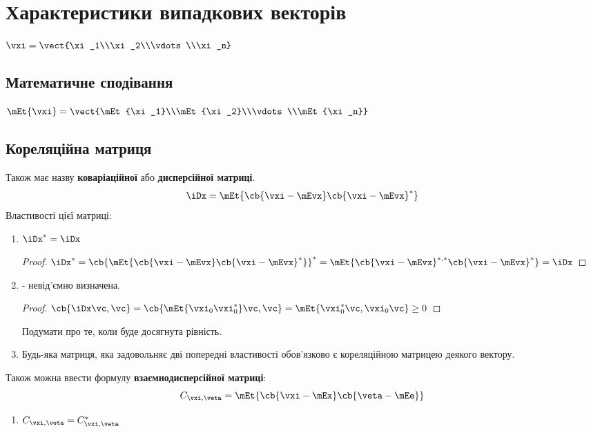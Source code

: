 \section{Характеристики випадкових векторів}
$\vxi = \vect{\xi_1\\\xi_2\\\vdots\\\xi_n}$
\subsection{Математичне сподівання}
$\mEt{\vxi} = \vect{\mEt{\xi_1}\\\mEt{\xi_2}\\\vdots\\\mEt{\xi_n}}$
\subsection{Кореляційна матриця}
Також має назву \textbf{коваріаційної} або \textbf{дисперсійної матриці}.
\begin{equation}
\iDx = \mEt{\cb{\vxi-\mEvx}\cb{\vxi-\mEvx}^\ast}
\end{equation}
Властивості цієї матриці:
\begin{enumerate}
\item $\iDx^\ast = \iDx$
\begin{proof}
$\iDx^\ast = \cb{\mEt{\cb{\vxi-\mEvx}\cb{\vxi-\mEvx}^\ast}}^\ast = \mEt{\cb{\vxi-\mEvx}^{\ast,\ast}\cb{\vxi-\mEvx}^\ast}=\iDx$
\end{proof}
\item \iDx - невід’ємно визначена.
\begin{proof}
$\cb{\iDx\vc,\vc} = \cb{\mEt{\vxi_0\vxi_0^\ast}\vc,\vc} = \mEt{\vxi_0^\ast\vc,\vxi_0\vc}\geq 0$
\end{proof}
\begin{war}
Подумати про те, коли буде досягнута рівність.
\end{war}
\item Будь-яка матриця, яка задовольняє дві попередні властивості обов’язково є кореляційною матрицею деякого вектору. 
\end{enumerate}
Також можна ввести формулу \textbf{взаємнодисперсійної матриці}:
\begin{equation}
C_{\vxi,\veta} = \mEt{\cb{\vxi - \mEx}\cb{\veta-\mEe}}
\end{equation}
\begin{enumerate}
\item $C_{\vxi,\veta} = C_{\vxi,\veta}^\ast$
\end{enumerate}
